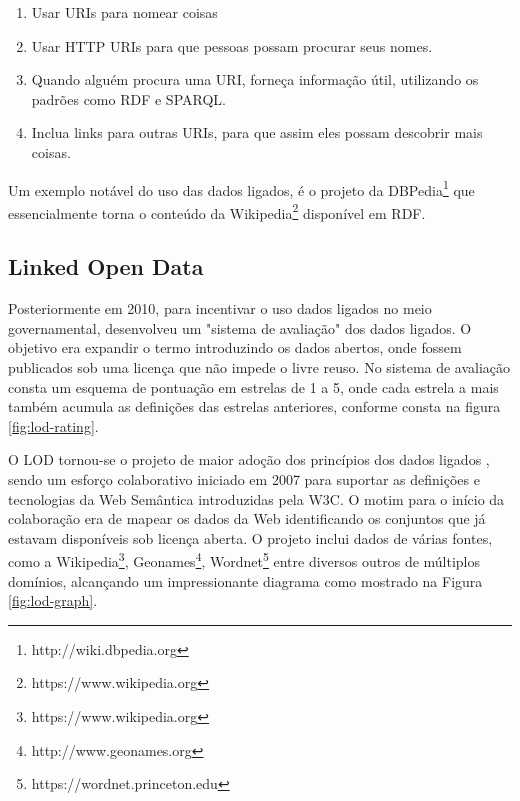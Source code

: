 \begin{enumerate}
	\item{Usar URIs para nomear coisas}
	\item{Usar \ac{HTTP} URIs para que pessoas possam procurar seus nomes.}
	\item{Quando alguém procura uma URI, forneça informação útil, utilizando os padrões como RDF e SPARQL.}
	\item{Inclua links para outras URIs, para que assim eles possam descobrir mais coisas.}	
\end{enumerate}

Um exemplo notável do uso das dados ligados, é o projeto da DBPedia\footnote{ http://wiki.dbpedia.org} que essencialmente torna o conteúdo da Wikipedia\footnote{https://www.wikipedia.org} disponível em RDF.

\subsection{Linked Open Data}

Posteriormente em 2010, para incentivar o uso dados ligados no meio governamental, \cite{LinkedData:2006} desenvolveu um "sistema de avaliação" dos dados ligados. O objetivo era expandir o termo introduzindo os dados abertos, onde fossem publicados sob uma licença que não impede o livre reuso. No sistema de avaliação consta um esquema de pontuação em estrelas de 1 a 5, onde cada estrela a mais também acumula as definições das estrelas anteriores, conforme consta na figura \ref{fig:lod-rating}.

O \ac{LOD} tornou-se o projeto de maior adoção dos princípios dos dados ligados \citep{Bizer2009}, sendo um esforço colaborativo iniciado em 2007 para suportar as definições e tecnologias da Web Semântica introduzidas pela W3C. O motim para o início da colaboração era de mapear os dados da Web identificando os conjuntos que já estavam disponíveis sob licença aberta. O projeto inclui dados de várias fontes, como a Wikipedia\footnote{https://www.wikipedia.org}, Geonames\footnote{http://www.geonames.org}, Wordnet\footnote{https://wordnet.princeton.edu} entre diversos outros de múltiplos domínios, alcançando um impressionante diagrama como mostrado na Figura \ref{fig:lod-graph}.

